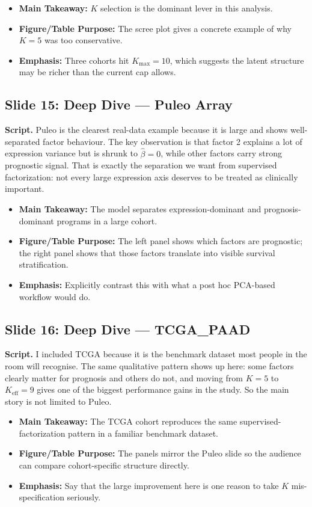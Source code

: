 \documentclass[11pt]{article}
\newcommand{\sectionlabel}[1]{\textbf{#1}}
\begin{document}
\begin{itemize}
\item \sectionlabel{Main Takeaway:} $K$ selection is the dominant lever in this analysis.
\item \sectionlabel{Figure/Table Purpose:} The scree plot gives a concrete example of why $K=5$ was too conservative.
\item \sectionlabel{Emphasis:} Three cohorts hit $K_{\max}=10$, which suggests the latent structure may be richer than the current cap allows.
\end{itemize}

\subsection*{Slide 15: Deep Dive --- Puleo Array}
\textbf{Script.} Puleo is the clearest real-data example because it is large and shows well-separated factor behaviour. The key observation is that factor 2 explains a lot of expression variance but is shrunk to $\hat{\beta}=0$, while other factors carry strong prognostic signal. That is exactly the separation we want from supervised factorization: not every large expression axis deserves to be treated as clinically important.

\begin{itemize}
\item \sectionlabel{Main Takeaway:} The model separates expression-dominant and prognosis-dominant programs in a large cohort.
\item \sectionlabel{Figure/Table Purpose:} The left panel shows which factors are prognostic; the right panel shows that those factors translate into visible survival stratification.
\item \sectionlabel{Emphasis:} Explicitly contrast this with what a post hoc PCA-based workflow would do.
\end{itemize}

\subsection*{Slide 16: Deep Dive --- TCGA\_PAAD}
\textbf{Script.} I included TCGA because it is the benchmark dataset most people in the room will recognise. The same qualitative pattern shows up here: some factors clearly matter for prognosis and others do not, and moving from $K=5$ to $K_{\text{eff}}=9$ gives one of the biggest performance gains in the study. So the main story is not limited to Puleo.

\begin{itemize}
\item \sectionlabel{Main Takeaway:} The TCGA cohort reproduces the same supervised-factorization pattern in a familiar benchmark dataset.
\item \sectionlabel{Figure/Table Purpose:} The panels mirror the Puleo slide so the audience can compare cohort-specific structure directly.
\item \sectionlabel{Emphasis:} Say that the large improvement here is one reason to take $K$ mis-specification seriously.
\end{itemize}
\end{document}
